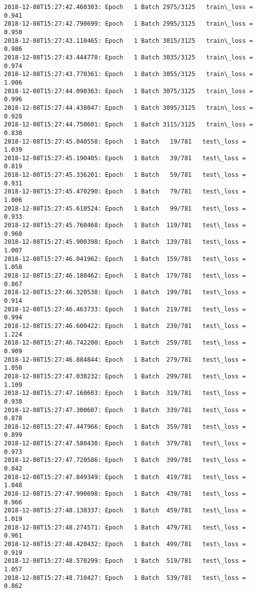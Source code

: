 \documentclass[11pt]{article}
\begin{document}
\begin{Verbatim}[commandchars=\\\{\}]
2018-12-08T15:27:42.460303: Epoch   1 Batch 2975/3125   train\_loss = 0.941
2018-12-08T15:27:42.790699: Epoch   1 Batch 2995/3125   train\_loss = 0.950
2018-12-08T15:27:43.110465: Epoch   1 Batch 3015/3125   train\_loss = 0.986
2018-12-08T15:27:43.444778: Epoch   1 Batch 3035/3125   train\_loss = 0.974
2018-12-08T15:27:43.770361: Epoch   1 Batch 3055/3125   train\_loss = 1.006
2018-12-08T15:27:44.090363: Epoch   1 Batch 3075/3125   train\_loss = 0.996
2018-12-08T15:27:44.438047: Epoch   1 Batch 3095/3125   train\_loss = 0.928
2018-12-08T15:27:44.750601: Epoch   1 Batch 3115/3125   train\_loss = 0.830
2018-12-08T15:27:45.040558: Epoch   1 Batch   19/781   test\_loss = 1.039
2018-12-08T15:27:45.190405: Epoch   1 Batch   39/781   test\_loss = 0.819
2018-12-08T15:27:45.336201: Epoch   1 Batch   59/781   test\_loss = 0.931
2018-12-08T15:27:45.470290: Epoch   1 Batch   79/781   test\_loss = 1.006
2018-12-08T15:27:45.610524: Epoch   1 Batch   99/781   test\_loss = 0.933
2018-12-08T15:27:45.760468: Epoch   1 Batch  119/781   test\_loss = 0.960
2018-12-08T15:27:45.900398: Epoch   1 Batch  139/781   test\_loss = 1.007
2018-12-08T15:27:46.041962: Epoch   1 Batch  159/781   test\_loss = 1.058
2018-12-08T15:27:46.180462: Epoch   1 Batch  179/781   test\_loss = 0.867
2018-12-08T15:27:46.320538: Epoch   1 Batch  199/781   test\_loss = 0.914
2018-12-08T15:27:46.463733: Epoch   1 Batch  219/781   test\_loss = 0.994
2018-12-08T15:27:46.600422: Epoch   1 Batch  239/781   test\_loss = 1.224
2018-12-08T15:27:46.742200: Epoch   1 Batch  259/781   test\_loss = 0.909
2018-12-08T15:27:46.884844: Epoch   1 Batch  279/781   test\_loss = 1.050
2018-12-08T15:27:47.030232: Epoch   1 Batch  299/781   test\_loss = 1.109
2018-12-08T15:27:47.160603: Epoch   1 Batch  319/781   test\_loss = 0.938
2018-12-08T15:27:47.300607: Epoch   1 Batch  339/781   test\_loss = 0.878
2018-12-08T15:27:47.447966: Epoch   1 Batch  359/781   test\_loss = 0.899
2018-12-08T15:27:47.580430: Epoch   1 Batch  379/781   test\_loss = 0.973
2018-12-08T15:27:47.720586: Epoch   1 Batch  399/781   test\_loss = 0.842
2018-12-08T15:27:47.849349: Epoch   1 Batch  419/781   test\_loss = 1.048
2018-12-08T15:27:47.990698: Epoch   1 Batch  439/781   test\_loss = 0.966
2018-12-08T15:27:48.130337: Epoch   1 Batch  459/781   test\_loss = 1.019
2018-12-08T15:27:48.274571: Epoch   1 Batch  479/781   test\_loss = 0.961
2018-12-08T15:27:48.420432: Epoch   1 Batch  499/781   test\_loss = 0.919
2018-12-08T15:27:48.570299: Epoch   1 Batch  519/781   test\_loss = 1.057
2018-12-08T15:27:48.710427: Epoch   1 Batch  539/781   test\_loss = 0.862

\end{Verbatim}
\end{document}
